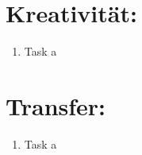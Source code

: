     \section*{Kreativität:}
    \begin{enumerate}[label=(\alph*)]
        \item Task a
    \end{enumerate}
    \section*{Transfer:}
    \begin{enumerate}[label=(\alph*)]
        \item Task a
    \end{enumerate}







